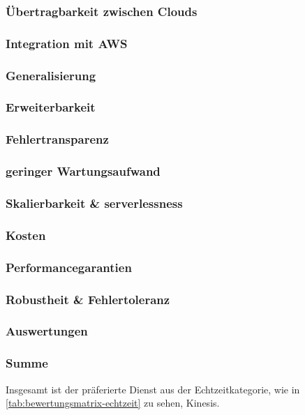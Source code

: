 \subsubsection{Übertragbarkeit zwischen Clouds}
\subsubsection{Integration mit AWS}
\subsubsection{Generalisierung}
\subsubsection{Erweiterbarkeit}
\subsubsection{Fehlertransparenz}
\subsubsection{geringer Wartungsaufwand}
\subsubsection{Skalierbarkeit \& serverlessness}
\subsubsection{Kosten}
\subsubsection{Performancegarantien}
\subsubsection{Robustheit \& Fehlertoleranz}
\subsubsection{Auswertungen}
\subsubsection{Summe} 



Insgesamt ist der präferierte Dienst aus der Echtzeitkategorie, wie in \autoref{tab:bewertungsmatrix-echtzeit} zu sehen, Kinesis.

